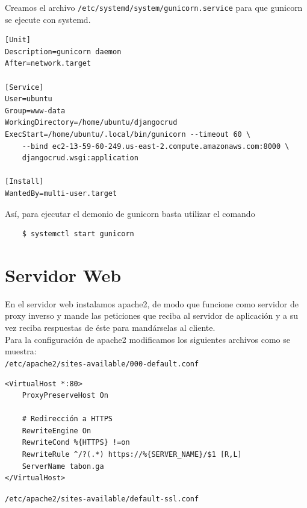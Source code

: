 \documentclass[9pt]{article}
\begin{document}
Creamos el archivo \texttt{/etc/systemd/system/gunicorn.service} para que \textsf{gunicorn} se ejecute con \textsf{systemd}.

\begin{verbatim}
[Unit]
Description=gunicorn daemon
After=network.target

[Service]
User=ubuntu
Group=www-data
WorkingDirectory=/home/ubuntu/djangocrud
ExecStart=/home/ubuntu/.local/bin/gunicorn --timeout 60 \
    --bind ec2-13-59-60-249.us-east-2.compute.amazonaws.com:8000 \
    djangocrud.wsgi:application

[Install]
WantedBy=multi-user.target
\end{verbatim}

Así, para ejecutar el demonio de \textsf{gunicorn} basta utilizar el comando
\begin{verbatim}
    $ systemctl start gunicorn
\end{verbatim}

\newpage

\section{Servidor Web}

En el servidor web instalamos \textsf{apache2}, de modo que funcione como servidor de proxy inverso y mande las peticiones que reciba al servidor de aplicación y a su vez reciba respuestas de éste para mandárselas al cliente. \\

Para la configuración de \textsf{apache2} modificamos los siguientes archivos como se muestra: \\

\texttt{/etc/apache2/sites-available/000-default.conf}

\begin{verbatim}
<VirtualHost *:80>
    ProxyPreserveHost On

    # Redirección a HTTPS
    RewriteEngine On
    RewriteCond %{HTTPS} !=on
    RewriteRule ^/?(.*) https://%{SERVER_NAME}/$1 [R,L]
    ServerName tabon.ga
</VirtualHost>
\end{verbatim}

\texttt{/etc/apache2/sites-available/default-ssl.conf}
\end{document}
